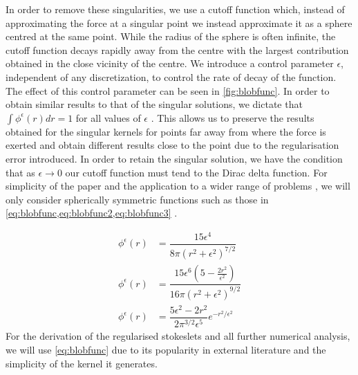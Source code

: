 In order to remove these singularities, we use a cutoff function \cite{Cortez2001,Cortez2005} which, instead of approximating the force at a singular point we instead approximate it as a sphere centred at the same point. While the radius of the sphere is often infinite, the cutoff function decays rapidly away from the centre with the largest contribution obtained in the close vicinity of the centre. We introduce a control parameter $\epsilon$, independent of any discretization, to control the rate of decay of the function. The effect of this control parameter can be seen in \cref{fig:blobfunc}. In order to obtain similar results to that of the singular solutions, we dictate that $\int \phi^\epsilon(r)dr=1$ for all values of $\epsilon$ . This allows us to preserve the results obtained for the singular kernels for points far away from where the force is exerted and obtain different results close to the point due to the regularisation error introduced. In order to retain the singular solution, we have the condition that as $\epsilon \to 0$ our cutoff function must tend to the Dirac delta function. For simplicity of the paper and the application to a wider range of problems \cite{Olson2013ModelingFormulation}, we will only consider spherically symmetric functions such as those in \cref{eq:blobfunc,eq:blobfunc2,eq:blobfunc3} \cite{Olson2013ModelingFormulation,Nguyen2014ReductionFlow,Zhao2019}.

\begin{align}
    \label{eq:blobfunc}\phi^\epsilon(r) &= \dfrac{15 \epsilon^4}{8\pi\left( r^2 +\epsilon^2 \right)^{7/2}} \\
    \label{eq:blobfunc2}\phi^{\epsilon}(r) &= \dfrac{15 \epsilon^{6}\left(5-\frac{2 r^{2}}{\epsilon^{2}}\right)}{16 \pi\left(r^{2}+\epsilon^{2}\right)^{9 / 2}}\\
    \label{eq:blobfunc3}\phi^{\epsilon}(r) &= \dfrac{5 \epsilon^{2}-2 r^{2}}{2 \pi^{3 / 2} \epsilon^{5}} e^{-r^{2} / \epsilon^{2}} 
\end{align}   
For the derivation of the regularised stokeslets and all further numerical analysis, we will use \cref{eq:blobfunc} due to its popularity in external literature and the simplicity of the kernel it generates.

